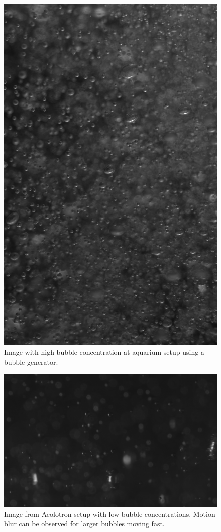 \begin{figure}
	\centering
	\includegraphics[scale=0.3]{images/aquarium_result_high_conc.jpg}
	\caption{Image with high bubble concentration at aquarium setup using a bubble generator.}
\end{figure}


\begin{figure}
	\centering
	\includegraphics[scale=0.3]{images/aeolotron_result_raw.bmp}
	\caption{Image from Aeolotron setup with low bubble concentrations. Motion blur can be observed for larger bubbles moving fast.}
\end{figure}